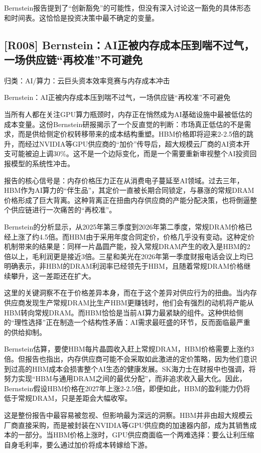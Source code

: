 \documentclass[11pt]{ctexart}
\begin{document}
Bernstein报告提到了“创新豁免”的可能性，但没有深入讨论这一豁免的具体形态和时间表。这恰恰是投资决策中最不确定的变量。

\subsection{[R008] Bernstein：AI正被内存成本压到喘不过气，一场供应链“再校准”不可避免}
{\small\color{refgray}归类：AI/算力：云巨头资本效率竞赛与内存成本冲击}

Bernstein：AI正被内存成本压到喘不过气，一场供应链“再校准”不可避免

当所有人都在关注GPU算力瓶颈时，内存正在悄然成为AI基础设施中最被低估的成本变量。这份Bernstein研报揭示了一个反直觉的判断：市场真正低估的不是需求，而是供给侧定价权转移带来的成本结构重塑。HBM价格即将迎来2-2.5倍的跳升，而经过NVIDIA等GPU供应商的“加价”传导后，超大规模云厂商的AI资本开支可能被迫上调30\%。这不是一个边际变化，而是一个需要重新审视整个AI投资回报模型的系统性冲击。

报告的核心信号是：内存价格压力正在从消费电子蔓延至AI领域。过去三年，HBM作为AI算力的“伴生品”，其定价一直被长期合同锁定，与暴涨的常规DRAM价格形成了巨大背离。这种背离正在扭曲内存供应商的产能分配决策，也将倒逼整个供应链进行一次痛苦的“再校准”。

Bernstein的分析显示，从2025年第三季度到2026年第二季度，常规DRAM价格已经上涨了约4.5倍。而HBM由于采用年度合同定价，价格几乎没有变动。这种定价机制带来的结果是：同样一片晶圆产能，投入常规DRAM产生的收入是HBM的2倍以上，毛利润更是接近3倍。三星和美光在2026年第一季度财报电话会议上均已明确表示，非HBM的DRAM利润率已经领先于HBM，且随着常规DRAM价格继续攀升，这一差距还在扩大。

这里的关键洞察不在于价格差异本身，而在于这个差异对供应行为的扭曲。当内存供应商发现生产常规DRAM比生产HBM更赚钱时，他们会有强烈的动机将产能从HBM转向常规DRAM。而HBM恰恰是当前AI算力最紧缺的组件。这种供给侧的“理性选择”正在制造一个结构性矛盾：AI需求最旺盛的环节，反而面临最严重的供给抑制。

Bernstein估算，要使HBM每片晶圆收入赶上常规DRAM，HBM价格需要上涨约3倍。但报告也指出，内存供应商可能不会采取如此激进的定价策略，因为他们意识到过高的HBM成本会损害整个AI生态的健康发展。SK海力士在财报中也强调，将努力实现“HBM与通用DRAM之间的最优分配”，而非追求收入最大化。因此，Bernstein假设HBM价格在2027年上涨2-2.5倍，即便如此，HBM的盈利能力仍将低于常规DRAM，只是差距会大幅收窄。

这是整份报告中最容易被忽视、但影响最为深远的洞察。HBM并非由超大规模云厂商直接采购，而是被封装在NVIDIA等GPU供应商的加速器内部，成为其销售成本的一部分。当HBM价格上涨时，GPU供应商面临一个两难选择：要么让利压缩自身毛利率，要么通过加价将成本转嫁给下游。
\end{document}

